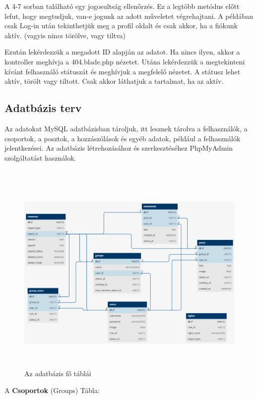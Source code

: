 \documentclass[
]{thesis-ekf}
\theoremstyle{definition}
\theoremstyle{remark}
\begin{document}

\vspace{5mm}

A 4-7 sorban található egy jogosultság ellenőrzés. Ez a legtöbb metódus előtt lefut, hogy megtudjuk, van-e jogunk az adott műveletet végrehajtani. A példában csak Log-in után tekinthetjük meg a profil oldalt és csak akkor, ha a fiókunk aktív. (vagyis nincs törölve, vagy tiltva)

Ezután lekérdezzük a megadott ID alapján az adatot. Ha nincs ilyen, akkor a kontroller meghívja a 404.blade.php nézetet. Utána lekérdezzük a megtekinteni kívánt felhasználó státuszát és meghívjuk a megfelelő nézetet. A státusz lehet aktív, törölt vagy tiltott. Csak akkor láthatjuk a tartalmat, ha az aktív.

\subsection{Adatbázis terv}

Az adatokat MySQL adatbázisban tároljuk, itt lesznek tárolva a felhasználók, a csoportok, a posztok, a hozzászólások és egyéb adatok, például a felhasználók jelentkezései.
Az adatbázis létrehozásához és szerkesztéséhez PhpMyAdmin szolgáltatást használok.
\\\\
\begin{figure}[H]
	\centering
	\includegraphics[width=15cm, height=10cm]{db}
	\caption{Az adatbázis fő táblái}
	\label{fig:picture}
\end{figure}
\pagebreak
\noindent
A \textbf{Csoportok} (Groups) Tábla:
\end{document}

